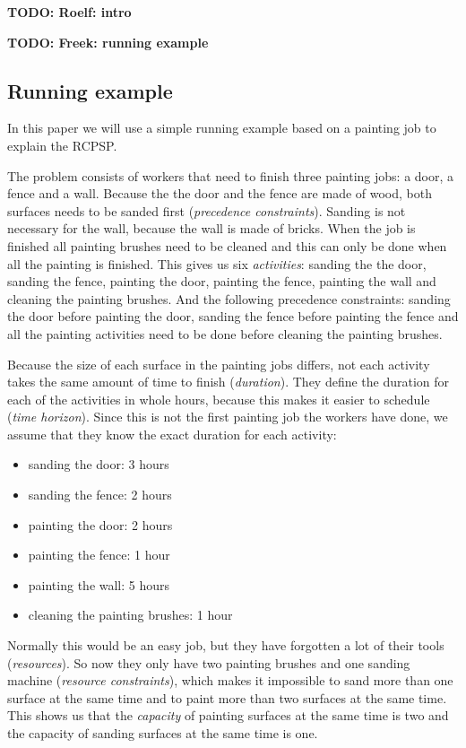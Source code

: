\documentclass{article}
\theoremstyle{definition}
\newcommand{\TODO}[1]{{\color{red}\textbf{TODO: #1}}}
\begin{document}
\TODO{Roelf: intro}

\TODO{Freek: running example}

\subsection{Running example}
In this paper we will use a simple running example based on a painting job to explain the RCPSP.

The problem consists of workers that need to finish three painting jobs: a door, a fence and a wall.
Because the the door and the fence are made of wood, both surfaces needs to be sanded first (\emph{precedence constraints}).
Sanding is not necessary for the wall, because the wall is made of bricks.
When the job is finished all painting brushes need to be cleaned and this can only be done when all the painting is finished.
This gives us six \emph{activities}: sanding the the door, sanding the fence,  painting the door, painting the fence, painting the wall and cleaning the painting brushes.
And the following precedence constraints: sanding the door before painting the door, sanding the fence before painting the fence and all the painting activities need to be done before cleaning the painting brushes.

Because the size of each surface in the painting jobs differs, not each activity takes the same amount of time to finish (\emph{duration}).
They define the duration for each of the activities in whole hours, because this makes it easier to schedule (\emph{time horizon}).
Since this is not the first painting job the workers have done, we assume that they know the exact duration for each activity:
\begin{itemize}
\item sanding the door: 3 hours
\item sanding the fence: 2 hours
\item painting the door: 2 hours
\item painting the fence: 1 hour
\item painting the wall: 5 hours
\item cleaning the painting brushes: 1 hour
\end{itemize}
Normally this would be an easy job, but they have forgotten a lot of their tools (\emph{resources}).
So now they only have two painting brushes and one sanding machine (\emph{resource constraints}), which makes it impossible to sand more than one surface at the same time and to paint more than two surfaces at the same time.
This shows us that the \emph{capacity} of painting surfaces at the same time is two and the capacity of sanding surfaces at the same time is one.
\end{document}
